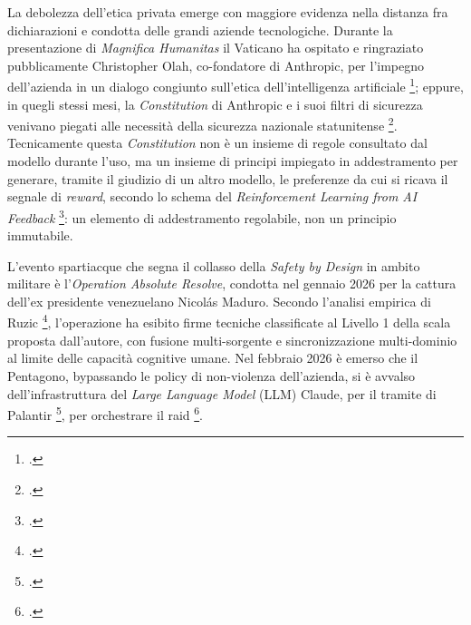 \ifstampa\documentclass[a4paper,12pt,twoside,openright]{report}\else\documentclass[a4paper,12pt]{report}\fi
\newif\ifrevisione \revisionefalse
\DeclareRobustCommand{\rev}[1]{\ifrevisione{\color{blue!65!black}#1}\else#1\fi}
\begin{document}
La debolezza dell'etica privata emerge con maggiore evidenza \rev{nella distanza fra dichiarazioni e condotta delle}
grandi aziende tecnologiche. Durante la presentazione di \textit{Magnifica
Humanitas} il Vaticano ha ospitato e ringraziato pubblicamente Christopher Olah,
co-fondatore di Anthropic, per l'impegno dell'azienda in un dialogo congiunto
sull'etica dell'intelligenza artificiale \footcite{enciclica_2026}; eppure, in
quegli stessi mesi, la \textit{Constitution} di Anthropic e i suoi filtri di
sicurezza venivano piegati alle necessità della sicurezza nazionale statunitense
\footcite{carter_2026}. Tecnicamente questa \textit{Constitution} non è un insieme
\rev{di regole consultato dal modello durante l'uso, ma un insieme di principi
impiegato in addestramento per generare, tramite il giudizio di un altro
modello, le preferenze da cui si ricava il segnale di \textit{reward}, secondo
lo schema del} \textit{Reinforcement Learning from AI Feedback}
\footcite{bai_2022_cai}: un \rev{elemento} di addestramento regolabile, non un
principio immutabile.

L'evento spartiacque che segna il collasso della \textit{Safety by Design} in
ambito militare è l'\textit{Operation Absolute Resolve}, condotta nel gennaio 2026
per la cattura dell'ex presidente venezuelano Nicolás Maduro. \rev{Secondo
l'analisi empirica} di Ruzic \footcite{ruzic_2026}, l'operazione ha esibito
firme tecniche \rev{classificate al Livello 1 della scala proposta dall'autore}, con fusione multi-sorgente e sincronizzazione
multi-dominio al limite delle capacità cognitive umane. Nel febbraio 2026 è
emerso che il Pentagono, bypassando le policy di non-violenza dell'azienda, si è
avvalso dell'infrastruttura del \textit{Large Language Model} (LLM) Claude, per il tramite di Palantir
\footcite{palantir_calumet_2026}, per orchestrare il raid
\footcite{ruzic_2026, carter_2026}.
\end{document}
